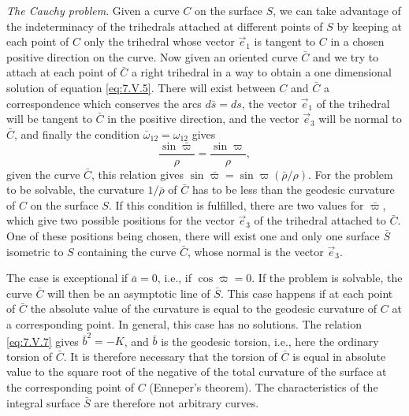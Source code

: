 \documentclass[leqno,11pt]{book}
\numberwithin{equation}{chapter}
\theoremstyle{shape1}
\theoremstyle{shape0}
\theoremstyle{shape2}
\theoremstyle{definition}
\begin{document}
\vspace{12pt}\fsec\emph{The Cauchy problem}. Given a curve $C$ on the surface $S$, we can take advantage of the indeterminacy of the trihedrals attached at different points of $S$ by keeping at each point of $C$ only the trihedral whose vector $\vec e_{1}$ is tangent to $C$ in a chosen positive direction on the curve. Now given an oriented curve $\bar C$ and we try to attach at each point of $\bar C$ a right trihedral in a way to obtain a one dimensional solution of equation \eqref{eq:7.V.5}. There will exist between $C$ and $\bar C$ a correspondence which conserves the arcs $d\bar s=ds$, the vector $\vec e_{1}$ of the trihedral will be tangent to $\bar C$ in the positive direction, and the vector $\vec e_{3}$ will be normal to $\bar C$, and finally the condition $\bar \omega_{12}=\omega_{12}$ gives
\[
\frac{\sin\bar\varpi}{\rho}=\frac{\sin\varpi}{\rho},
\]
given the curve $\bar C$, this relation gives $\sin\bar\varpi=\sin\varpi({\bar\rho}/{\rho})$. For the problem to be solvable, the curvature $1/\bar\rho$ of $\bar C$ has to be less than the geodesic curvature of $C$ on the surface $S$. If this condition is fulfilled, there are two values for $\bar\varpi$, which give two possible positions for the vector $\vec e_{3}$ of the trihedral attached to $\bar C$. One of these positions being chosen, there will exist one and only one surface $\bar S$ isometric to $S$ containing the curve $\bar C$, whose normal is the vector $\vec e_{3}$.

The case is exceptional if $\bar a=0$, i.e., if $\cos\bar\varpi=0$. If the problem is solvable, the curve $\bar C$ will then be an asymptotic line of $\bar S$. This case happens if at each point of $\bar C$ the absolute value of the curvature is equal to the geodesic curvature of $C$ at a corresponding point. In general, this case has no solutions. The relation \eqref{eq:7.V.7} gives $\bar b^{2}=-K$, and $\bar b$ is the geodesic torsion, i.e., here the ordinary torsion of $\bar C$. It is therefore necessary that the torsion of $\bar C$ is equal in absolute value to the  square root of the negative of the total curvature of the surface at the corresponding point of $C$ (Enneper's theorem). The characteristics of the integral surface $\bar S$ are therefore not arbitrary curves.
\end{document}
